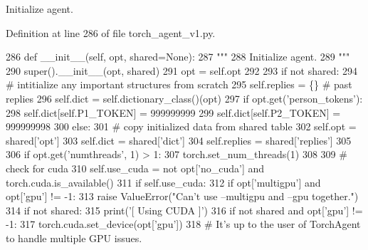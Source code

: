 \begin{DoxyVerb}Initialize agent.
\end{DoxyVerb}
 

Definition at line 286 of file torch\+\_\+agent\+\_\+v1.\+py.


\begin{DoxyCode}
286     \textcolor{keyword}{def }\_\_init\_\_(self, opt, shared=None):
287         \textcolor{stringliteral}{"""}
288 \textcolor{stringliteral}{        Initialize agent.}
289 \textcolor{stringliteral}{        """}
290         super().\_\_init\_\_(opt, shared)
291         opt = self.opt
292 
293         \textcolor{keywordflow}{if} \textcolor{keywordflow}{not} shared:
294             \textcolor{comment}{# intitialize any important structures from scratch}
295             self.replies = \{\}  \textcolor{comment}{# past replies}
296             self.dict = self.dictionary\_class()(opt)
297             \textcolor{keywordflow}{if} opt.get(\textcolor{stringliteral}{'person\_tokens'}):
298                 self.dict[self.P1\_TOKEN] = 999999999
299                 self.dict[self.P2\_TOKEN] = 999999998
300         \textcolor{keywordflow}{else}:
301             \textcolor{comment}{# copy initialized data from shared table}
302             self.opt = shared[\textcolor{stringliteral}{'opt'}]
303             self.dict = shared[\textcolor{stringliteral}{'dict'}]
304             self.replies = shared[\textcolor{stringliteral}{'replies'}]
305 
306         \textcolor{keywordflow}{if} opt.get(\textcolor{stringliteral}{'numthreads'}, 1) > 1:
307             torch.set\_num\_threads(1)
308 
309         \textcolor{comment}{# check for cuda}
310         self.use\_cuda = \textcolor{keywordflow}{not} opt[\textcolor{stringliteral}{'no\_cuda'}] \textcolor{keywordflow}{and} torch.cuda.is\_available()
311         \textcolor{keywordflow}{if} self.use\_cuda:
312             \textcolor{keywordflow}{if} opt[\textcolor{stringliteral}{'multigpu'}] \textcolor{keywordflow}{and} opt[\textcolor{stringliteral}{'gpu'}] != -1:
313                 \textcolor{keywordflow}{raise} ValueError(\textcolor{stringliteral}{"Can't use --multigpu and --gpu together."})
314             \textcolor{keywordflow}{if} \textcolor{keywordflow}{not} shared:
315                 print(\textcolor{stringliteral}{'[ Using CUDA ]'})
316             \textcolor{keywordflow}{if} \textcolor{keywordflow}{not} shared \textcolor{keywordflow}{and} opt[\textcolor{stringliteral}{'gpu'}] != -1:
317                 torch.cuda.set\_device(opt[\textcolor{stringliteral}{'gpu'}])
318             \textcolor{comment}{# It's up to the user of TorchAgent to handle multiple GPU issues.}

\end{DoxyCode}
